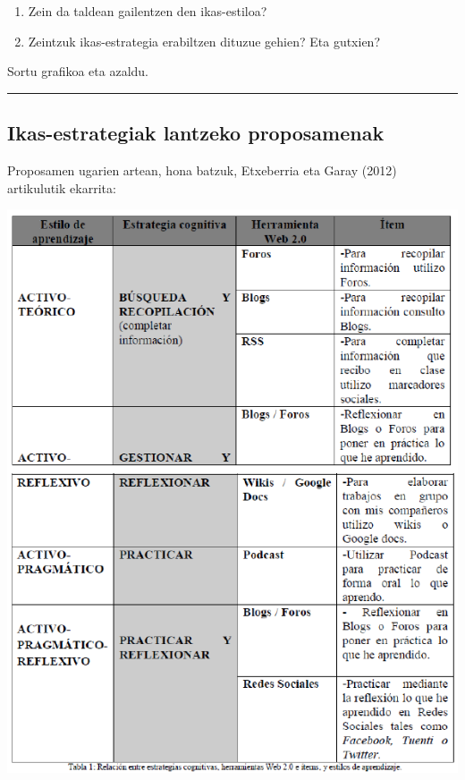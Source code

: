 \documentclass[
]{book}
\providecommand{\tightlist}{%
  \setlength{\itemsep}{0pt}\setlength{\parskip}{0pt}}
\begin{document}
\begin{enumerate}
\def\labelenumi{\arabic{enumi}.}
\tightlist
\item
  Zein da taldean gailentzen den ikas-estiloa?
\item
  Zeintzuk ikas-estrategia erabiltzen dituzue gehien?
  Eta gutxien?
\end{enumerate}

Sortu grafikoa eta azaldu.

\begin{center}\rule{0.5\linewidth}{0.5pt}\end{center}

\hypertarget{ikas-estrategiak-lantzeko-proposamenak}{%
\subsection{Ikas-estrategiak lantzeko proposamenak}\label{ikas-estrategiak-lantzeko-proposamenak}}

Proposamen ugarien artean, hona batzuk, Etxeberria eta Garay (2012) artikulutik ekarrita:

\includegraphics{assets/06-03.png}
\end{document}
